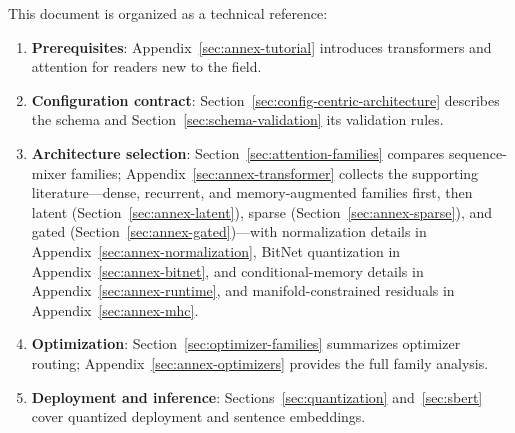 This document is organized as a technical reference:
\begin{enumerate}[leftmargin=*]
    \item \textbf{Prerequisites}: Appendix~\ref{sec:annex-tutorial} introduces transformers and attention for readers new to the field.
    \item \textbf{Configuration contract}: Section~\ref{sec:config-centric-architecture} describes the schema and Section~\ref{sec:schema-validation} its validation rules.
    \item \textbf{Architecture selection}: Section~\ref{sec:attention-families} compares sequence-mixer families; Appendix~\ref{sec:annex-transformer} collects the supporting literature---dense, recurrent, and memory-augmented families first, then latent (Section~\ref{sec:annex-latent}), sparse (Section~\ref{sec:annex-sparse}), and gated (Section~\ref{sec:annex-gated})---with normalization details in Appendix~\ref{sec:annex-normalization}, BitNet quantization in Appendix~\ref{sec:annex-bitnet}, and conditional-memory details in Appendix~\ref{sec:annex-runtime}, and manifold-constrained residuals in Appendix~\ref{sec:annex-mhc}.
    \item \textbf{Optimization}: Section~\ref{sec:optimizer-families} summarizes optimizer routing; Appendix~\ref{sec:annex-optimizers} provides the full family analysis.
    \item \textbf{Deployment and inference}: Sections~\ref{sec:quantization} and~\ref{sec:sbert} cover quantized deployment and sentence embeddings.
\end{enumerate}

